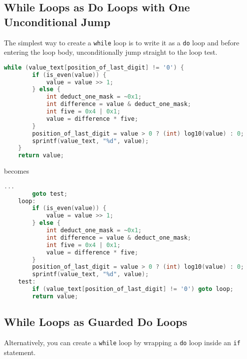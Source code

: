 \documentclass{article}
\begin{document}
\newpage
\subsection{While Loops as Do Loops with One Unconditional Jump}

The simplest way to create a \lstinline{while} loop is to write it as a \lstinline{do} loop and before entering the loop body, unconditionally jump straight to the loop test.

\begin{lstlisting}[language=C, linebackgroundcolor={
    %    \ifodd\value{lstnumber}\color{green}\fi
    \ifnum\value{lstnumber}=1 \color{green}\fi,
    \ifnum\value{lstnumber}=12 \color{green}\fi,
}]
    while (value_text[position_of_last_digit] != '0') {
        if (is_even(value)) {
            value = value >> 1;
        } else {
            int deduct_one_mask = ~0x1;
            int difference = value & deduct_one_mask;
            int five = 0x4 | 0x1;
            value = difference * five;
        }
        position_of_last_digit = value > 0 ? (int) log10(value) : 0;
        sprintf(value_text, "%d", value);
    }
    return value;
\end{lstlisting}

becomes

\begin{lstlisting}[language=C, linebackgroundcolor={
    %    \ifodd\value{lstnumber}\color{green}\fi
    \ifnum\value{lstnumber}=2 \color{green}\fi,
    \ifnum\value{lstnumber}=3 \color{green}\fi,
    \ifnum\value{lstnumber}=14 \color{green}\fi,
    \ifnum\value{lstnumber}=15 \color{green}\fi,
}]
        ...
        goto test;
    loop:
        if (is_even(value)) {
            value = value >> 1;
        } else {
            int deduct_one_mask = ~0x1;
            int difference = value & deduct_one_mask;
            int five = 0x4 | 0x1;
            value = difference * five;
        }
        position_of_last_digit = value > 0 ? (int) log10(value) : 0;
        sprintf(value_text, "%d", value);
    test:
        if (value_text[position_of_last_digit] != '0') goto loop;
        return value;
\end{lstlisting}

\newpage
\subsection{While Loops as Guarded Do Loops}

Alternatively, you can create a \lstinline{while} loop by wrapping a \lstinline{do} loop inside an \lstinline{if} statement.
\end{document}
